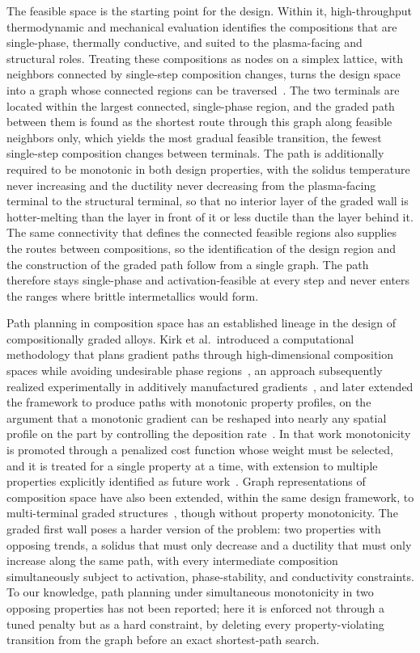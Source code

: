 The feasible space is the starting point for the design. Within it, high-throughput
thermodynamic and mechanical evaluation identifies the compositions that are
single-phase, thermally conductive, and suited to the plasma-facing and structural
roles. Treating these compositions as nodes on a simplex lattice, with neighbors
connected by single-step composition changes, turns the design space into a graph
whose connected regions can be traversed~\cite{nimplex}. The two terminals are
located within the largest connected, single-phase region, and the graded path
between them is found as the shortest route through this graph along feasible
neighbors only, which yields the most gradual feasible transition, the fewest
single-step composition changes between terminals. The path is additionally
required to be monotonic in both design properties, with the solidus
temperature never increasing and the ductility never decreasing from the
plasma-facing terminal to the structural terminal, so that no interior layer
of the graded wall is hotter-melting than the layer in front of it or less
ductile than the layer behind it. The same connectivity that
defines the connected feasible regions also supplies the routes between
compositions, so the identification of the design region and the construction of
the graded path follow from a single graph. The path therefore stays single-phase
and activation-feasible at every step and never enters the ranges where brittle
intermetallics would form.

Path planning in composition space has an established lineage in the design of
compositionally graded alloys. Kirk et al.\ introduced a computational
methodology that plans gradient paths through high-dimensional composition
spaces while avoiding undesirable phase regions~\cite{kirk2018gradient}, an
approach subsequently realized experimentally in additively manufactured
gradients~\cite{eliseeva2019fgm}, and later extended the framework to produce
paths with monotonic property profiles, on the argument that a monotonic
gradient can be reshaped into nearly any spatial profile on the part by
controlling the deposition rate~\cite{kirk2021monotonic}. In that work
monotonicity is promoted through a penalized cost function whose weight must
be selected, and it is treated for a single property at a time, with extension
to multiple properties explicitly identified as future
work~\cite{kirk2021monotonic}. Graph representations of composition space
have also been extended, within the same design framework, to multi-terminal
graded structures~\cite{multiterminalCGA2024}, though without property
monotonicity. The graded
first wall poses a harder version of the problem: two properties with opposing
trends, a solidus that must only decrease and a ductility that must only
increase along the same path, with every intermediate composition
simultaneously subject to activation, phase-stability, and conductivity
constraints. To our knowledge, path planning under simultaneous monotonicity
in two opposing properties has not been reported; here it is enforced not
through a tuned penalty but as a hard constraint, by deleting every
property-violating transition from the graph before an exact shortest-path
search.

